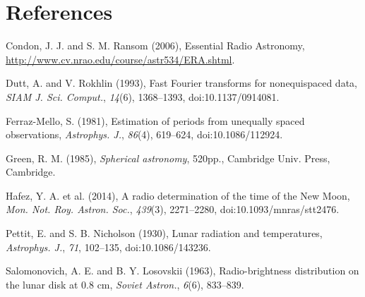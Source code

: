 \documentclass[10pt]{article}
\begin{document}
\section{References}

\hangindent 0.25in Condon, J. J. and S. M. Ransom (2006), Essential Radio Astronomy, \\
\href{http://www.cv.nrao.edu/course/astr534/ERA.shtml}
{http://www.cv.nrao.edu/course/astr534/ERA.shtml}.

\hangindent 0.25in Dutt, A. and V. Rokhlin (1993), Fast Fourier transforms for
nonequispaced data, \textit{SIAM J. Sci. Comput.}, \textit{14}(6),
1368--1393, doi:10.1137/0914081.

\hangindent 0.25in Ferraz-Mello, S. (1981), Estimation of periods from
unequally spaced observations, \textit{Astrophys. J.}, \textit{86}(4),
619--624, doi:10.1086/112924.

\hangindent 0.25in Green, R. M. (1985), \textit{Spherical astronomy}, 520pp.,
Cambridge Univ. Press, Cambridge.

\hangindent 0.25in Hafez, Y. A. et al. (2014), A radio determination of the time of the New Moon, \textit{Mon. Not. Roy. Astron. Soc.}, \textit{439}(3), 2271--2280, doi:10.1093/mnras/stt2476.

\hangindent 0.25in Pettit, E. and S. B. Nicholson (1930), Lunar radiation and temperatures, \textit{Astrophys. J.}, \textit{71}, 102--135, doi:10.1086/143236.

\hangindent 0.25in Salomonovich, A. E. and B. Y. Losovskii (1963), Radio-brightness distribution on the lunar disk at 0.8 cm, \textit{Soviet Astron.}, \textit{6}(6), 833--839.
\end{document}
